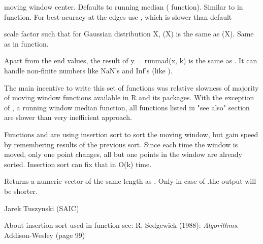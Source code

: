 \begin{Arguments}
\begin{ldescription}
\item[\code{center}] moving window center. Defaults 
to running median ( function). Similar to   
in  function. For best acuracy at the edges use 
, which is slower than default

\item[\code{constant}] scale factor such that for Gaussian 
distribution X, (X) is the same as (X). 
Same as  in  function.
\end{ldescription}
\end{Arguments}
\begin{Details}\relax
Apart from the end values, the result of y = runmad(x, k) is the same as 
. It can handle 
non-finite numbers like NaN's and Inf's (like ).

The main incentive to write this set of functions was relative slowness of 
majority of moving window functions available in R and its packages.  With the 
exception of , a running window median function, all 
functions listed in "see also" section are slower than very inefficient 
 approach. 

Functions  and  are using insertion sort to 
sort the moving window, but gain speed by remembering results of the previous 
sort. Since each time the window is moved, only one point changes, all but one 
points in the window are already sorted. Insertion sort can fix that in O(k) 
time.
\end{Details}
\begin{Value}
Returns a numeric vector of the same length as . Only in case of 
.the output will be shorter.
\end{Value}
\begin{Author}\relax
Jarek Tuszynski (SAIC) 
\end{Author}
\begin{References}\relax
About insertion sort used in  function see: 
R. Sedgewick (1988): \emph{Algorithms}. Addison-Wesley (page 99)
\end{References}
